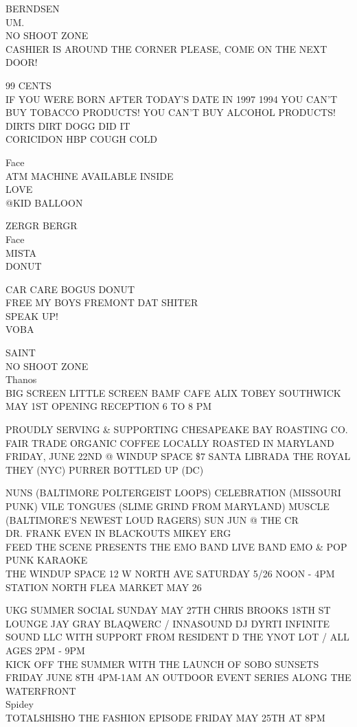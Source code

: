 \documentclass[10pt,letterpaper]{article}
\begin{document}
BERNDSEN\\
UM.\\
NO SHOOT ZONE\\
CASHIER IS AROUND THE CORNER PLEASE, COME ON THE NEXT DOOR!

99 CENTS\\
IF YOU WERE BORN AFTER TODAY'S DATE IN 1997 1994 YOU CAN'T BUY TOBACCO PRODUCTS!  YOU CAN'T BUY ALCOHOL PRODUCTS!\\
DIRTS DIRT DOGG DID IT\\
CORICIDON HBP COUGH COLD

Face\\
ATM MACHINE AVAILABLE INSIDE\\
LOVE\\
@KID BALLOON

ZERGR BERGR\\
Face\\
MISTA\\
DONUT

CAR CARE BOGUS DONUT\\
FREE MY BOYS FREMONT DAT SHITER\\
SPEAK UP!\\
VOBA

SAINT\\
NO SHOOT ZONE\\
Thanos\\
BIG SCREEN LITTLE SCREEN BAMF CAFE ALIX TOBEY SOUTHWICK MAY 1ST OPENING RECEPTION 6 TO 8 PM

PROUDLY SERVING \& SUPPORTING CHESAPEAKE BAY ROASTING CO. FAIR TRADE ORGANIC COFFEE LOCALLY ROASTED IN MARYLAND\\
FRIDAY, JUNE 22ND @ WINDUP SPACE \$7 SANTA LIBRADA THE ROYAL THEY (NYC) PURRER BOTTLED UP (DC)

NUNS (BALTIMORE POLTERGEIST LOOPS) CELEBRATION (MISSOURI PUNK) VILE TONGUES (SLIME GRIND FROM MARYLAND) MUSCLE (BALTIMORE'S NEWEST LOUD RAGERS) SUN JUN @ THE CR\\
DR. FRANK EVEN IN BLACKOUTS MIKEY ERG\\
FEED THE SCENE PRESENTS THE EMO BAND LIVE BAND EMO \& POP PUNK KARAOKE\\
THE WINDUP SPACE 12 W NORTH AVE SATURDAY 5/26 NOON {-} 4PM STATION NORTH FLEA MARKET MAY 26

UKG SUMMER SOCIAL SUNDAY MAY 27TH CHRIS BROOKS 18TH ST LOUNGE JAY GRAY BLAQWERC / INNASOUND DJ DYRTI INFINITE SOUND LLC WITH SUPPORT FROM RESIDENT D THE YNOT LOT / ALL AGES 2PM {-} 9PM\\
KICK OFF THE SUMMER WITH THE LAUNCH OF SOBO SUNSETS FRIDAY JUNE 8TH 4PM{-}1AM AN OUTDOOR EVENT SERIES ALONG THE WATERFRONT\\
Spidey\\
TOTALSHISHO THE FASHION EPISODE FRIDAY MAY 25TH AT 8PM
\end{document}
